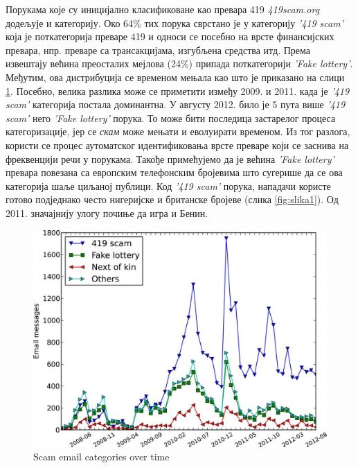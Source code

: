 \documentclass[a4paper]{article}
\begin{document}
Порукама које су иницијално класификоване као превара 419 \emph{419scam.org} \cite{org} додељује и категорију. Око 64\% тих порука сврстано је у категорију \emph{'419 scam'} која је поткатегорија преваре 419 и односи се посебно на врсте финансијских превара, нпр. преваре са трансакцијама, изгубљена средства итд. Према извештају \cite{org} већина преосталих мејлова (24\%) припада поткатегорији \emph{'Fake lottery'}. Међутим, ова дистрибуција се временом мењала као што је приказано на слици \ref{fig:slika}. Посебно, велика разлика може се приметити између 2009. и 2011. када је \emph{'419 scam'} категорија постала доминантна. У августу 2012. било је 5 пута више \emph{'419 scam'} него \emph{'Fake lottery'} порука. То може бити последица застарелог процеса категоризације, јер се \emph{скам} може мењати и еволуирати временом. Из тог разлога, користи се процес аутоматског идентификовања врсте преваре који се заснива на фреквенцији речи у порукама. Такође примећујемо да је већина \emph{'Fake lottery'} превара повезана са европским телефонским бројевима што сугерише да се ова категорија шаље циљаној публици. Код \emph{'419 scam'} порука, нападачи користе готово подједнако често нигеријске и британске бројеве (слика \ref{fig:slika1}). Од 2011. значајнију улогу почиње да игра и Бенин.

\begin{figure}[h!]
\begin{center}
\includegraphics[scale=0.2]{slike/1.jpg}
\end{center}
\caption{Scam email categories over time}
\label{fig:slika}
\end{figure}
\end{document}
